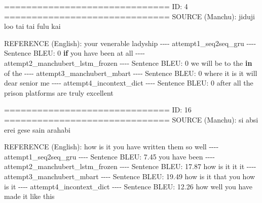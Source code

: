 \documentclass[
  letterpaper,
  DIV=11,
  numbers=noendperiod]{scrartcl}
\newenvironment{Shaded}{\begin{snugshade}}{\end{snugshade}}
\newcommand{\ControlFlowTok}[1]{\textcolor[rgb]{0.00,0.23,0.31}{\textbf{#1}}}
\newcommand{\DecValTok}[1]{\textcolor[rgb]{0.68,0.00,0.00}{#1}}
\newcommand{\ErrorTok}[1]{\textcolor[rgb]{0.68,0.00,0.00}{#1}}
\newcommand{\FloatTok}[1]{\textcolor[rgb]{0.68,0.00,0.00}{#1}}
\newcommand{\FunctionTok}[1]{\textcolor[rgb]{0.28,0.35,0.67}{#1}}
\newcommand{\NormalTok}[1]{\textcolor[rgb]{0.00,0.23,0.31}{#1}}
\newcommand{\SpecialCharTok}[1]{\textcolor[rgb]{0.37,0.37,0.37}{#1}}
\begin{document}
\begin{Shaded}
\begin{Highlighting}[]

\SpecialCharTok{==}\ErrorTok{============================}
\NormalTok{ID}\SpecialCharTok{:} \DecValTok{4}
\SpecialCharTok{==}\ErrorTok{============================}
\FunctionTok{SOURCE}\NormalTok{ (Manchu)}\SpecialCharTok{:}
\NormalTok{jiduji loo tai tai fulu kai}

\FunctionTok{REFERENCE}\NormalTok{ (English)}\SpecialCharTok{:}
\NormalTok{your venerable ladyship}
\SpecialCharTok{{-}{-}{-}{-}}\NormalTok{ attempt1\_seq2seq\_gru }\SpecialCharTok{{-}{-}{-}{-}}
\NormalTok{Sentence BLEU}\SpecialCharTok{:} \DecValTok{0}
\ControlFlowTok{if}\NormalTok{ you have been at all}
\SpecialCharTok{{-}{-}{-}{-}}\NormalTok{ attempt2\_manchubert\_lstm\_frozen }\SpecialCharTok{{-}{-}{-}{-}}
\NormalTok{Sentence BLEU}\SpecialCharTok{:} \DecValTok{0}
\NormalTok{we will be to the }\ControlFlowTok{in}\NormalTok{ of the}
\SpecialCharTok{{-}{-}{-}{-}}\NormalTok{ attempt3\_manchubert\_mbart }\SpecialCharTok{{-}{-}{-}{-}}
\NormalTok{Sentence BLEU}\SpecialCharTok{:} \DecValTok{0}
\NormalTok{where it is it will dear senior me}
\SpecialCharTok{{-}{-}{-}{-}}\NormalTok{ attempt4\_incontext\_dict }\SpecialCharTok{{-}{-}{-}{-}}
\NormalTok{Sentence BLEU}\SpecialCharTok{:} \DecValTok{0}
\NormalTok{after all the prison platforms are truly excellent}

\SpecialCharTok{==}\ErrorTok{============================}
\NormalTok{ID}\SpecialCharTok{:} \DecValTok{16}
\SpecialCharTok{==}\ErrorTok{============================}
\FunctionTok{SOURCE}\NormalTok{ (Manchu)}\SpecialCharTok{:}
\NormalTok{si absi erei gese sain arahabi}

\FunctionTok{REFERENCE}\NormalTok{ (English)}\SpecialCharTok{:}
\NormalTok{how is it you have written them so well}
\SpecialCharTok{{-}{-}{-}{-}}\NormalTok{ attempt1\_seq2seq\_gru }\SpecialCharTok{{-}{-}{-}{-}}
\NormalTok{Sentence BLEU}\SpecialCharTok{:} \FloatTok{7.45}
\NormalTok{you have been}
\SpecialCharTok{{-}{-}{-}{-}}\NormalTok{ attempt2\_manchubert\_lstm\_frozen }\SpecialCharTok{{-}{-}{-}{-}}
\NormalTok{Sentence BLEU}\SpecialCharTok{:} \FloatTok{17.87}
\NormalTok{how is it it it}
\SpecialCharTok{{-}{-}{-}{-}}\NormalTok{ attempt3\_manchubert\_mbart }\SpecialCharTok{{-}{-}{-}{-}}
\NormalTok{Sentence BLEU}\SpecialCharTok{:} \FloatTok{19.49}
\NormalTok{how is it that you how is it}
\SpecialCharTok{{-}{-}{-}{-}}\NormalTok{ attempt4\_incontext\_dict }\SpecialCharTok{{-}{-}{-}{-}}
\NormalTok{Sentence BLEU}\SpecialCharTok{:} \FloatTok{12.26}
\NormalTok{how well you have made it like this}
\end{Highlighting}
\end{Shaded}
\end{document}
